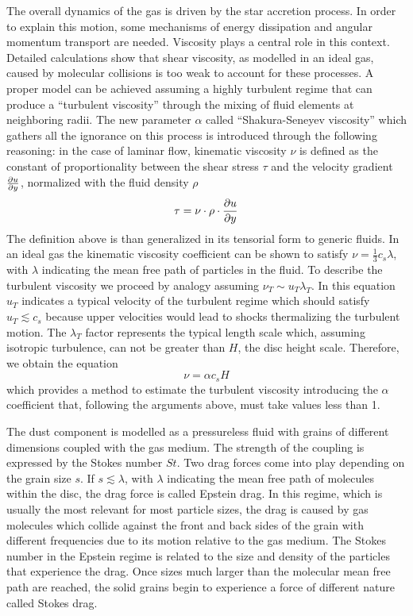 \documentclass[a4paper,10pt]{report}
\begin{document}
The overall dynamics of the gas is driven by the star accretion process. In order to explain this motion, some mechanisms of energy dissipation and angular momentum transport
are needed. Viscosity plays a central role in this context. Detailed calculations show that shear viscosity, 
as modelled in an ideal gas, caused by molecular collisions is too weak to account for these processes. 
A proper model can be achieved assuming a highly turbulent regime that can produce a ``turbulent viscosity'' through the mixing of fluid elements
at neighboring radii. The new parameter $\alpha$
called ``Shakura-Seneyev viscosity'' which gathers all the ignorance on this process is introduced through the following reasoning:
in the case of laminar flow, kinematic viscosity $\nu$ is defined as the constant of 
proportionality between the shear stress $\tau$ and the velocity gradient  $\pdv{u}{y}$, normalized with the fluid density $\rho$
\begin{equation}
    \tau = \nu \cdot \rho \cdot \pdv{u}{y}
\end{equation}
The definition above is than generalized in its tensorial form to generic fluids.
In an ideal gas the kinematic viscosity coefficient can be shown to satisfy $\nu = \frac{1}{3}c_s\lambda$,
with $\lambda$ indicating the mean free path of particles in the fluid.
To describe the turbulent viscosity we proceed by analogy assuming $\nu_T \sim u_T \lambda_T$. In this equation $u_T$ indicates a typical velocity of the turbulent regime
which should 
satisfy $u_T \lesssim c_s$ because upper velocities would lead to shocks thermalizing the turbulent motion.
The $\lambda_T$ factor 
represents the typical length scale which, assuming isotropic turbulence, can not be greater than $H$, the disc height scale.
Therefore, we obtain the equation
\begin{equation}
    \nu = \alpha c_s H
\end{equation}
which provides a method to estimate the turbulent viscosity introducing the $\alpha$ coefficient that, following the arguments above,
must take values less than 1.

The dust component is modelled as a pressureless fluid with grains of different dimensions coupled with the gas medium. 
The strength of the coupling is expressed by the Stokes number $St$.
Two drag forces come into play depending on the grain size $s$. 
If $s \lesssim \lambda$, with $\lambda$ indicating the mean free path of molecules within the disc, 
the drag force is called Epstein drag. 
In this regime, which is usually the most relevant for most particle sizes, 
the drag is caused by gas molecules which collide against the front and back sides of the grain with different 
frequencies due to its motion relative to the gas medium.
The Stokes number in the Epstein regime is related to the size and density of the particles that experience the drag.
Once sizes much larger than the molecular 
mean free path are reached, the solid grains begin to experience a force of different nature called Stokes drag.
\end{document}
